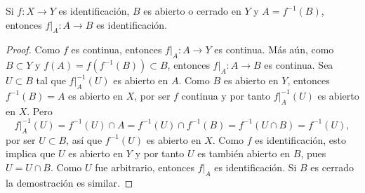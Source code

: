 

\begin{theorem}
Si $f : X \longrightarrow Y$ es identificación, $B$ es abierto o cerrado en $Y$ y $A = f^{-1}(B)$, entonces $f|_{A} : A \longrightarrow B$ es identificación.
\end{theorem}

\begin{proof}
Como $f$ es continua, entonces $f|_A : A \longrightarrow Y$ es continua. Más aún, como $B \subset Y$ y $f(A) = f(f^{-1}(B)) \subset B$, entonces $f|_A : A \longrightarrow B$ es continua. Sea $U \subset B$ tal que $f|_A^{-1}(U)$ es abierto en $A$. Como $B$ es abierto en $Y$, entonces $f^{-1}(B) = A$ es abierto en $X$, por ser $f$ continua y por tanto $f|_A^{-1}(U)$ es abierto en $X$. Pero
\begin{equation*}
    f|_A^{-1}(U) = f^{-1}(U) \cap A = f^{-1}(U) \cap f^{-1}(B) = f^{-1}(U \cap B) = f^{-1}(U),
\end{equation*}
por ser $U \subset B$, así que $f^{-1}(U)$ es abierto en $X$. Como $f$ es identificación, esto implica que $U$ es abierto en $Y$ y por tanto $U$ es también abierto en $B$, pues $U = U \cap B$. Como $U$ fue arbitrario, entonces $f|_A$ es identificación. Si $B$ es cerrado la demostración es similar.
\end{proof}
